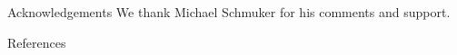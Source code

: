 \documentclass[final,hyperref={pdfpagelabels=false}]{beamer}
\begin{document}
\begin{frame}{}
\begin{columns}[t]
\begin{column}{.48\linewidth}
\begin{block}{Acknowledgements} 
We thank Michael Schmuker for his comments and support.
\end{block}

\begin{block}{References}
\nocite{*}

{\footnotesize

}
\end{block}

\end{column}
\end{columns}

\end{frame}
\end{document}
